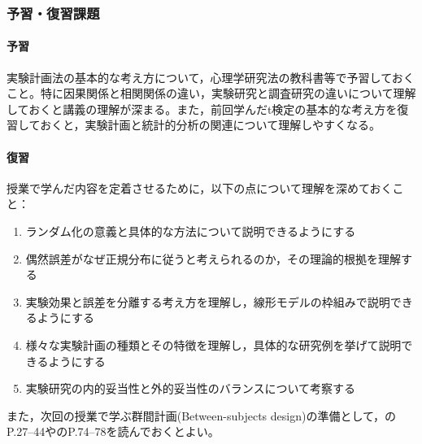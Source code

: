 \subsubsection{予習・復習課題}
\paragraph{予習}
実験計画法の基本的な考え方について，心理学研究法の教科書等で予習しておくこと。特に因果関係と相関関係の違い，実験研究と調査研究の違いについて理解しておくと講義の理解が深まる。また，前回学んだt検定の基本的な考え方を復習しておくと，実験計画と統計的分析の関連について理解しやすくなる。

\paragraph{復習}
授業で学んだ内容を定着させるために，以下の点について理解を深めておくこと：

\begin{enumerate}
\item ランダム化の意義と具体的な方法について説明できるようにする
\item 偶然誤差がなぜ正規分布に従うと考えられるのか，その理論的根拠を理解する
\item 実験効果と誤差を分離する考え方を理解し，線形モデルの枠組みで説明できるようにする
\item 様々な実験計画の種類とその特徴を理解し，具体的な研究例を挙げて説明できるようにする
\item 実験研究の内的妥当性と外的妥当性のバランスについて考察する
\end{enumerate}

また，次回の授業で学ぶ群間計画(Between-subjects design)の準備として，\textcite{Toyoda201706}のP.27--44や\textcite{kosugi2018}のP.74--78を読んでおくとよい。